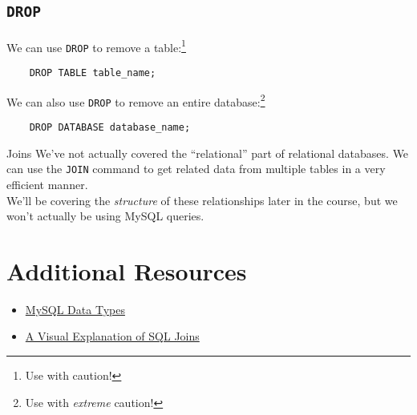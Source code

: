 \subsection{\texttt{DROP}}

We can use \texttt{DROP} to remove a table:\footnote{Use with caution!}

\begin{verbatim}
    DROP TABLE table_name;
\end{verbatim}

We can also use \texttt{DROP} to remove an entire database:\footnote{Use with \textit{extreme} caution!}

\begin{verbatim}
    DROP DATABASE database_name;
\end{verbatim}


\begin{infobox}{Joins}
    We've not actually covered the ``relational'' part of relational databases. We can use the \texttt{JOIN} command to get related data from multiple tables in a very efficient manner.
    \\

    We'll be covering the \textit{structure} of these relationships later in the course, but we won't actually be using MySQL queries.
\end{infobox}


\section{Additional Resources}

\begin{itemize}[leftmargin=*]
    \item \href{https://dev.mysql.com/doc/refman/5.7/en/data-types.html}{MySQL Data Types}
    \item \href{https://blog.codinghorror.com/a-visual-explanation-of-sql-joins/}{A Visual Explanation of SQL Joins}
\end{itemize}
